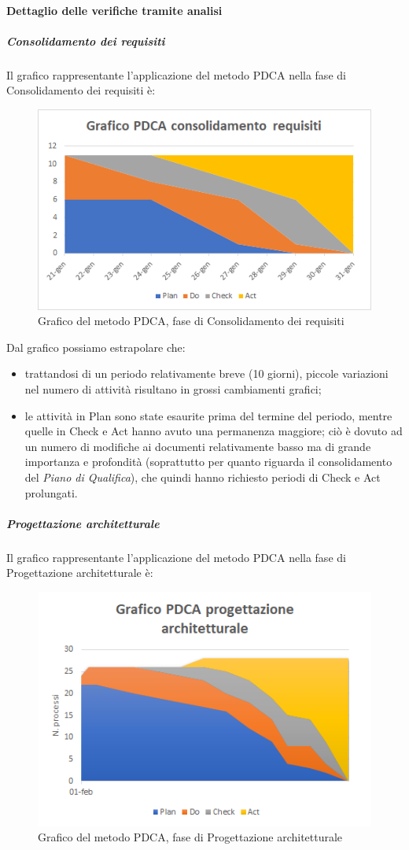 \paragraph{Dettaglio delle verifiche tramite analisi}
\subparagraph{Consolidamento dei requisiti}\MiniSpazio
Il grafico rappresentante l'applicazione del metodo PDCA nella fase di Consolidamento dei requisiti è:
\begin{figure} [H]
	\centering
	\includegraphics[scale=1]{Img/Grafico_PDCA_consolidamento_requisiti}
	\caption{Grafico del metodo PDCA, fase di Consolidamento dei requisiti}\label{}
\end{figure}
Dal grafico possiamo estrapolare che:
\begin{itemize}
	\item trattandosi di un periodo relativamente breve (10 giorni), piccole variazioni nel numero di attività risultano in grossi cambiamenti grafici;
	\item le attività in Plan sono state esaurite prima del termine del periodo, mentre quelle in Check e Act hanno avuto una permanenza maggiore; ciò è dovuto ad un numero di modifiche ai documenti relativamente basso ma di grande importanza e profondità (soprattutto per quanto riguarda il consolidamento del \emph{Piano di Qualifica}), che quindi hanno richiesto periodi di Check e Act prolungati.
\end{itemize}
\subparagraph{Progettazione architetturale}\MiniSpazio
Il grafico rappresentante l'applicazione del metodo PDCA nella fase di Progettazione architetturale è:
\begin{figure} [H]
	\centering
	\includegraphics[scale=1]{Img/Grafico_PDCA_progettazione_architetturale}
	\caption{Grafico del metodo PDCA, fase di Progettazione architetturale}\label{}
\end{figure}

